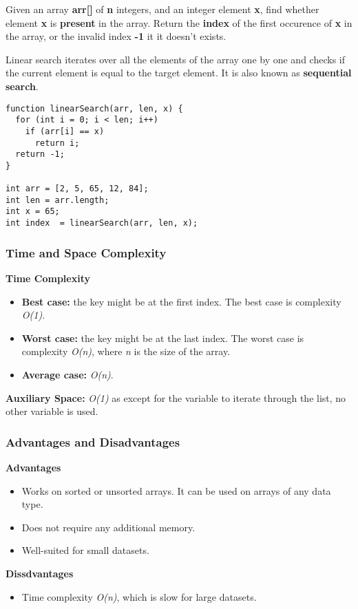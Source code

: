 Given an array \textbf{arr[]} of \textbf{n} integers, and an integer element \textbf{x}, find whether element \textbf{x} is \textbf{present} in the array. Return the \textbf{index} of the first occurence of \textbf{x} in the array, or the invalid index \textbf{-1} it it doesn't exists.

Linear search iterates over all the elements of the array one by one and checks if the current element is equal to the target element. It is also known as \textbf{sequential search}.

\begin{lstlisting}[style=general]
function linearSearch(arr, len, x) {
  for (int i = 0; i < len; i++)
    if (arr[i] == x)
      return i;
  return -1;
}

int arr = [2, 5, 65, 12, 84];
int len = arr.length;
int x = 65;
int index  = linearSearch(arr, len, x);
\end{lstlisting}

\subsubsection{Time and Space Complexity}

\textbf{Time Complexity}

\begin{itemize}
  \item \textbf{Best case:} the key might be at the first index. The best case is complexity \emph{O(1)}.
  \item \textbf{Worst case:} the key might be at the last index. The worst case is complexity \emph{O(n)}, where \textit{n} is the size of the array.
  \item \textbf{Average case:} \emph{O(n)}.
\end{itemize}

\textbf{Auxiliary Space:} \textit{O(1)} as except for the variable to iterate through the list, no other variable is used.

\subsubsection{Advantages and Disadvantages}

\textbf{Advantages}

\begin{itemize}
  \item Works on sorted or unsorted arrays. It can be used on arrays of any data type.
  \item Does not require any additional memory.
  \item Well-suited for small datasets.
\end{itemize}

\textbf{Dissdvantages}

\begin{itemize}
  \item Time complexity \textit{O(n)}, which is slow for large datasets.
\end{itemize}
